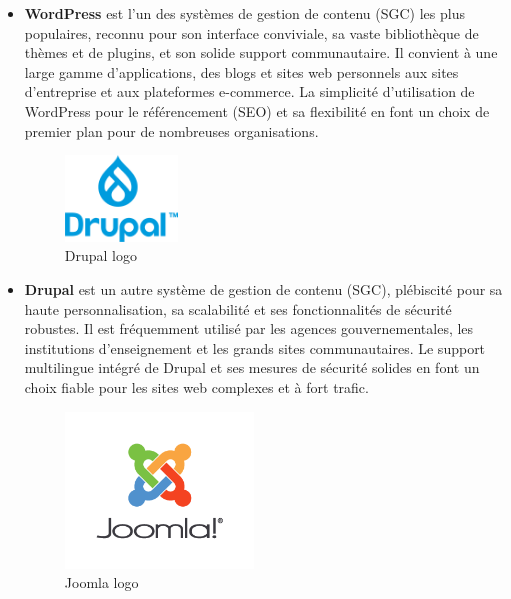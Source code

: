 \begin{itemize}

    \item \textbf{WordPress} est l'un des systèmes de gestion de contenu (SGC) les plus populaires, reconnu pour son interface conviviale, sa vaste bibliothèque de thèmes et de plugins, et son solide support communautaire. Il convient à une large gamme d'applications, des blogs et sites web personnels aux sites d'entreprise et aux plateformes e-commerce.  La simplicité d'utilisation de WordPress pour le référencement (SEO) et sa flexibilité en font un choix de premier plan pour de nombreuses organisations.
          \\
          \begin{figure}[H]
              \centering
              \includegraphics[width=3cm]{Figures/Drupal.png}
              \caption{Drupal logo}
          \end{figure}

    \item \textbf{Drupal} est un autre système de gestion de contenu (SGC), plébiscité pour sa haute personnalisation, sa scalabilité et ses fonctionnalités de sécurité robustes. Il est fréquemment utilisé par les agences gouvernementales, les institutions d'enseignement et les grands sites communautaires. Le support multilingue intégré de Drupal et ses mesures de sécurité solides en font un choix fiable pour les sites web complexes et à fort trafic.

          \begin{figure}[H]
              \centering
              \includegraphics[width=5cm]{Figures/Joomla.png}
              \caption{Joomla logo}
          \end{figure}



\end{itemize}
